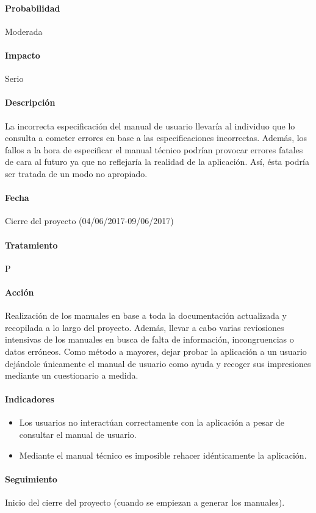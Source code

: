 \documentclass[10pt,a4paper]{article}
\begin{document}
				\paragraph{Probabilidad} Moderada
				\paragraph{Impacto}	Serio
				\paragraph{Descripción} La incorrecta especificación del manual de usuario llevaría al individuo que lo consulta a cometer errores en base a las especificaciones incorrectas. Además, los fallos a la hora de especificar el manual técnico podrían provocar errores fatales de cara al futuro ya que no reflejaría la realidad de la aplicación. Así, ésta podría ser tratada de un modo no apropiado.
				\paragraph{Fecha} Cierre del proyecto (04/06/2017-09/06/2017)
				\paragraph{Tratamiento} P
				\paragraph{Acción} Realización de los manuales en base a toda la documentación actualizada y recopilada a lo largo del proyecto. Además, llevar a cabo varias reviosiones intensivas de los manuales en busca de falta de información, incongruencias o datos erróneos. Como método a mayores, dejar probar la aplicación a un usuario dejándole únicamente el manual de usuario como ayuda y recoger sus impresiones mediante un cuestionario a medida.
				\paragraph{Indicadores} 
				\begin{itemize}
				    \item Los usuarios no interactúan correctamente con la aplicación a pesar de consultar el manual de usuario.
				    \item Mediante el manual técnico es imposible rehacer idénticamente la aplicación.
				\end{itemize}				 
				\paragraph{Seguimiento}	Inicio del cierre del proyecto (cuando se empiezan a generar los manuales).
				
\end{document}
